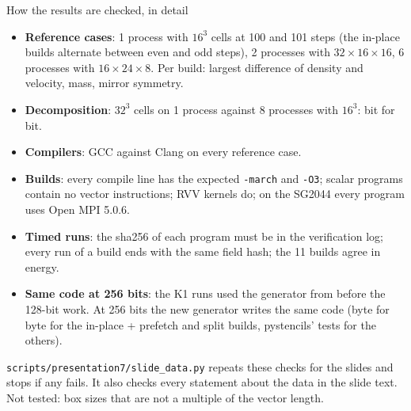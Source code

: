 \documentclass[aspectratio=169,10pt,t]{beamer}
\newcommand{\code}[1]{\texttt{#1}}
\begin{document}
\begin{frame}{How the results are checked, in detail}
  \vspace{1mm}
  \begin{itemize}\small
    \item \textbf{Reference cases}: 1 process with $16^3$ cells at 100 and 101 steps (the in-place builds alternate
          between even and odd steps), 2 processes with $32\times16\times16$, 6 processes with $16\times24\times8$.
          Per build: largest difference of density and velocity, mass, mirror symmetry.
    \item \textbf{Decomposition}: $32^3$ cells on 1 process against 8 processes with $16^3$: bit for bit.
    \item \textbf{Compilers}: GCC against Clang on every reference case.
    \item \textbf{Builds}: every compile line has the expected \code{-march} and \code{-O3}; scalar programs contain no
          vector instructions; RVV kernels do; on the SG2044 every program uses Open MPI 5.0.6.
    \item \textbf{Timed runs}: the sha256 of each program must be in the verification log; every run of a build ends
          with the same field hash; the 11 builds agree in energy.
    \item \textbf{Same code at 256 bits}: the K1 runs used the generator from before the 128-bit work. At 256 bits
          the new generator writes the same code (byte for byte for the in-place + prefetch and split builds,
          pystencils' tests for the others).
  \end{itemize}
  \vfill
  {\scriptsize\color{psgray}\code{scripts/presentation7/slide\_data.py} repeats these checks for the slides and
  stops if any fails. It also checks every statement about the data in the slide text. Not tested: box sizes that
  are not a multiple of the vector length.\par}
\end{frame}
\end{document}
